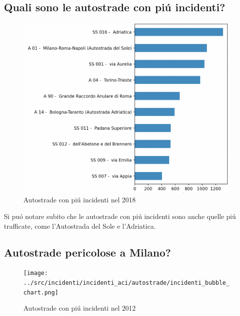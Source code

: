 \documentclass[a4paper]{report}
\begin{document}
\subsection{Quali sono le autostrade con pi\'u incidenti?}
\begin{figure}[!ht]
    \includegraphics[width=\linewidth]{../src/incidenti/incidenti_aci/autostrade/autostrade.png}
    \caption{Autostrade con pi\'u incidenti nel 2018}
    \label{fig:incidenti_autostrade}
\end{figure}

Si pu\'o notare subito che le autostrade con pi\'u incidenti sono anche quelle pi\'u trafficate, come 
l'Autostrada del Sole e l'Adriatica.




\clearpage
\subsection{Autostrade pericolose a Milano?}

\begin{figure}[!ht]
    \texttt{[image: ../src/incidenti/incidenti\_aci/autostrade/incidenti\_bubble\_chart.png]}
    \caption{Autostrade con pi\'u incidenti nel 2012}
    \label{fig:bubble_incidenti_milano}
\end{figure}




\clearpage
\end{document}
